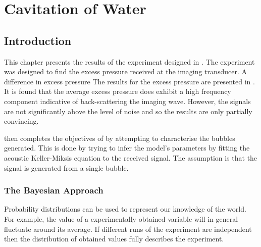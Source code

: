 \newcommand{\pEE}{88\mega\pascal}
\newcommand{\pOOE}{108\mega\pascal}
\newcommand{\pOTT}{132\mega\pascal}

\chapter{Cavitation of Water}\label{ch:water_cavitation}



\section{Introduction}

This chapter presents the results of the experiment designed in .
The experiment was designed to find the excess pressure
received at the imaging transducer.
A difference in excess pressure 
%
The results for the excess pressure are presented in .
It is found that the average excess pressure 
does exhibit a high frequency component indicative of back-scattering the imaging wave.
However, the signals are not significantly above the level of noise
and so the results are only partially convincing.
 

 then completes the objectives of 
by attempting to characterise the bubbles generated.
This is done by trying to infer the model's parameters
by fitting the acoustic Keller-Miksis equation to the received signal.
The assumption is that the signal is generated from a single bubble.

\subsection{The Bayesian Approach}
Probability distributions can be used to represent our knowledge of the world.
For example, the value of a  experimentally obtained variable will in general
fluctuate around its average.  
If different runs of the experiment are independent
then the  distribution of obtained values fully describes the experiment.

